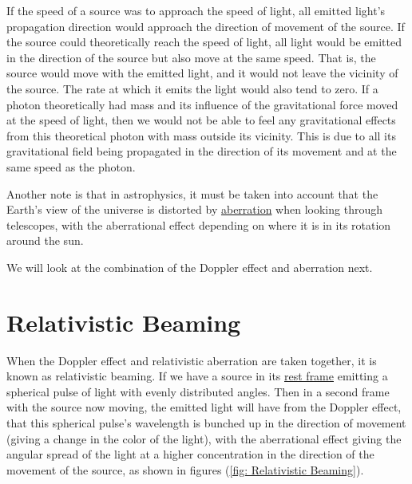 
If the speed of a source was to approach the speed of light, all emitted light's propagation direction would approach the direction of movement of the source.
If the source could theoretically reach the speed of light, all light would be emitted in the direction of the source but also move at the same speed.
That is, the source would move with the emitted light, and it would not leave the vicinity of the source.
The rate at which it emits the light would also tend to zero.
If a photon theoretically had mass and its influence of the gravitational force moved at the speed of light, then we would not be able to feel any gravitational effects from this theoretical photon with mass outside its vicinity.
This is due to all its gravitational field being propagated in the direction of its movement and at the same speed as the photon.

Another note is that in astrophysics, it must be taken into account that the Earth's view of the universe is distorted by \hyperlink{def-aberration}{aberration} when looking through telescopes, with the aberrational effect depending on where it is in its rotation around the sun.

We will look at the combination of the Doppler effect and aberration next.


\section{Relativistic Beaming} \label{sect: Intro Relativistic Beaming}

When the Doppler effect and relativistic aberration are taken together, it is known as relativistic beaming.
If we have a source in its \hyperlink{def-proper-frame}{rest frame} emitting a spherical pulse of light with evenly distributed angles.
Then in a second frame with the source now moving, the emitted light will have from the Doppler effect, that this spherical pulse's wavelength is bunched up in the direction of movement (giving a change in the color of the light), with the aberrational effect giving the angular spread of the light at a higher concentration in the direction of the movement of the source, as shown in figures (\ref{fig: Relativistic Beaming}).

